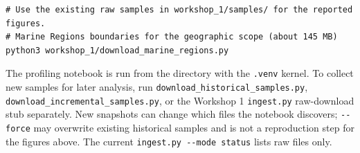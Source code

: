 \documentclass[a4paper,11pt,oneside]{book}
\begin{document}
\begin{appendices}
\begin{lstlisting}
# Use the existing raw samples in workshop_1/samples/ for the reported figures.
# Marine Regions boundaries for the geographic scope (about 145 MB)
python3 workshop_1/download_marine_regions.py

\end{lstlisting}
The profiling notebook  is run from the  directory with the \texttt{.venv} kernel.
To collect new samples for later analysis, run \texttt{download\_historical\_samples.py}, \texttt{download\_incremental\_samples.py}, or the Workshop 1 \texttt{ingest.py} raw-download stub separately. New snapshots can change which files the notebook discovers; \texttt{-{}-force} may overwrite existing historical samples and is not a reproduction step for the figures above. The current \texttt{ingest.py -{}-mode status} lists raw files only.
    \end{appendices}
\end{document}
